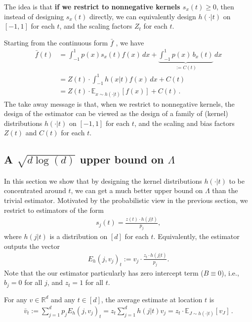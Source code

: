 \documentclass{article}
\theoremstyle{plain}
\theoremstyle{definition}
\theoremstyle{plain}
\newcommand{\R}{\mathbb R}
\newcommand{\E}{\mathbb E}
\begin{document}
The idea is that \textbf{if we restrict to nonnegative kernels $s_x(t) \ge 0$},
then instead of designing $s_x(t)$ directly, we can equivalently design $h(\cdot|t)$ on $[-1,1]$ for each $t$,
and the scaling factors $Z_t$ for each $t$.

Starting from the continuous form $\bar{f}$ , we have
\begin{align}
    \bar{f}(t) & = \int_{-1}^{1} p(x) s_x(t) f(x) \,dx + \underbrace{\int_{-1}^{1} p(x)\,b_x(t)}_{:=C(t)}\,dx \\
               & = Z(t) \cdot \int_{-1}^{1} h(x|t) f(x) \, dx + C(t)                                          \\
               & = Z(t) \cdot \E_{x\sim h(\cdot|t)}[f(x)] + C(t)\,.
\end{align}
The take away message is that, when we restrict to nonnegative kernels, the design of the estimator can be viewed as the design
of a family of (kernel) distributions $h(\cdot|t)$ on $[-1,1]$ for each $t$, and the scaling and bias factors $Z(t)$ and $C(t)$ for each $t$.

\subsection{A $\sqrt{d \log(d)}$ upper bound on \texorpdfstring{$\Lambda$}{Lambda}}
\label{sec:kernel_exp_family_bound}
In this section we show that by designing the kernel distributions $h(\cdot|t)$ to be concentrated around $t$, we can get a much better upper bound on $\Lambda$ than the trivial estimator.
Motivated by the probabilistic view in the previous section, we restrict to estimators of the form
\begin{align}
    \label{eq:S_from_pi}
    s_j(t) = \frac{z(t) \cdot h(j|t)}{p_j},
\end{align}
where $h(j|t)$ is a distribution on $[d]$ for each $t$.
Equivalently, the estimator outputs the vector
\begin{align}
    E_{h}(j,v_j)_t := v_j \cdot \frac{z_t \cdot h(j|t)}{p_j}.
\end{align}
Note that the our estimator particularly has zero intercept term ($B\equiv 0$), i.e., $b_j=0$ for all $j$, and $z_t = 1$ for all $t$.

For any $v\in\R^d$ and any $t\in[d]$, the average estimate at location $t$ is
\begin{align}
    \bar v_t := \sum_{j=1}^d p_j E_{h}(j,v_j)_t
    = z_t \sum_{j=1}^d h(j|t) v_j
    = z_t \cdot \E_{J\sim h(\cdot|t)}[v_J]\,.
\end{align}
\end{document}

